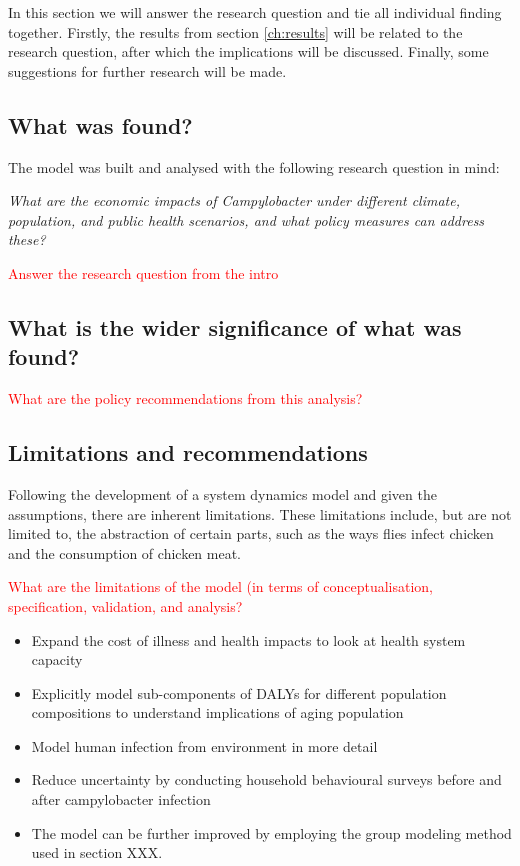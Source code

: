 In this section we will answer the research question and tie all individual finding together. Firstly, the results from section \ref{ch:results} will be related to the research question, after which the implications will be discussed. Finally, some suggestions for further research will be made. 

\subsection{What was found?}

The model was built and analysed with the following research question in mind: 

\begin{center}\textit{\textcolor{NiceBlue}{
What are the economic impacts of Campylobacter under different climate, population, and public health scenarios, and what policy measures can address these? }}
\end{center}


\textcolor{red}{Answer the research question from the intro}


\subsection{What is the wider significance of what was found?}
\textcolor{red}{What are the policy recommendations from this analysis?}


\subsection{Limitations and recommendations}

Following the development of a system dynamics model and given the assumptions, there are inherent limitations. These limitations include, but are not limited to, the abstraction of certain parts, such as the ways flies infect chicken and the consumption of chicken meat. 


\textcolor{red}{What are the limitations of the model (in terms of conceptualisation, specification, validation, and analysis?}
\begin{itemize}
    \item Expand the cost of illness and health impacts to look at health system capacity
    \item Explicitly model sub-components of DALYs for different population compositions to understand implications of aging population
    \item Model human infection from environment in more detail
    \item Reduce uncertainty by conducting household behavioural surveys before and after campylobacter infection
    \item The model can be further improved by employing the group modeling method used in section XXX. 
\end{itemize}